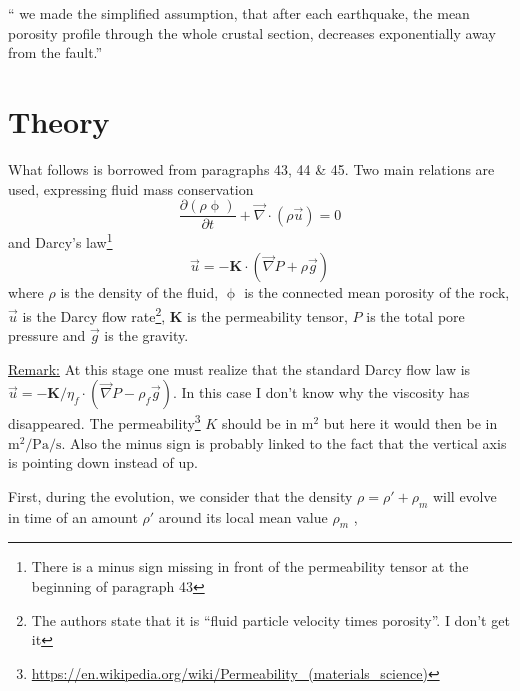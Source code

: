 ``
we made the simplified assumption, that after each earthquake, 
the mean porosity profile
through the whole crustal section, decreases exponentially
away from the fault.''





\section*{Theory}

What follows is borrowed from paragraphs 43, 44 \& 45.
Two main relations are used, expressing fluid mass conservation
\begin{equation}
\frac{\partial (\rho \upphi)}{\partial t} + \vec\nabla\cdot (\rho \vec{u}) = 0
\label{eq:por01}
\end{equation}
and Darcy's law\footnote{There is a minus sign missing in front of the permeability tensor at the 
beginning of paragraph 43}
\begin{equation}
\vec{u} = - {\bm K} \cdot (\vec{\nabla} P + \rho \vec{g})
\label{eq:por00}
\end{equation}
where $\rho$ is the density of the fluid, $\upphi$ is the
connected mean porosity of the rock, $\vec{u}$ is the Darcy flow
rate\footnote{The authors state that it is ``fluid particle velocity times porosity''. 
I don't get it}, ${\bm K}$ is the permeability tensor, $P$ is the total pore pressure and $\vec{g}$ is
the gravity. 

\underline{Remark:} 
At this stage one must realize that the standard Darcy flow law is $\vec{u} = - {\bm K}/\eta_f \cdot (\vec{\nabla} P - \rho_f \vec{g})$. In this case I don't know why the viscosity has disappeared. The permeability\footnote{\url{https://en.wikipedia.org/wiki/Permeability_(materials_science)}} $K$ should be in $\si{\square\meter}$ but here it would then be in $\si{\square\meter\per\pascal\per\second}$. Also the minus sign is probably linked to the fact that the vertical axis is pointing down instead of up. 



First, during the evolution, we consider that the density 
$\rho = \rho' + \rho_m$ will evolve in time of an amount $\rho'$ 
around its local mean value $\rho_m$ ,

